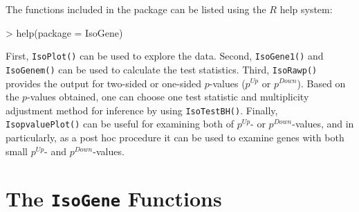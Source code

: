 \documentclass[10pt]{mybook4}
\begin{document}
The functions included in the package can be listed using the $R$
help system:

\begin{Schunk}
\begin{Sinput}
> help(package = IsoGene)
\end{Sinput}
\end{Schunk}






First, \texttt{IsoPlot()} can be used to
explore the data. Second, \texttt{IsoGene1()} and
\texttt{IsoGenem()} can be used to calculate the test statistics.
Third, \texttt{IsoRawp()} provides the output for two-sided or
one-sided $p$-values ($p^{Up}$ or $p^{Down}$). Based on the
$p$-values obtained, one can choose one test statistic and
multiplicity adjustment method for inference by using
\texttt{IsoTestBH()}. Finally, \texttt{IsopvaluePlot()} can be
useful for examining both of $p^{Up}$- or $p^{Down}$-values, and in
particularly, as a post hoc procedure it can be used to examine
genes with both small $p^{Up}$- and $p^{Down}$-values.


\section{The \texttt{IsoGene} Functions}
\end{document}
